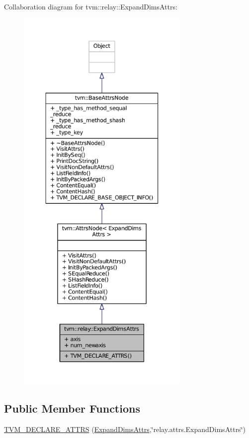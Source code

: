 Collaboration diagram for tvm\+:\+:relay\+:\+:Expand\+Dims\+Attrs\+:
\nopagebreak
\begin{figure}[H]
\begin{center}
\leavevmode
\includegraphics[height=550pt]{structtvm_1_1relay_1_1ExpandDimsAttrs__coll__graph}
\end{center}
\end{figure}
\subsection*{Public Member Functions}
\begin{DoxyCompactItemize}
\item 
\hyperlink{structtvm_1_1relay_1_1ExpandDimsAttrs_a81d264f861cabf1c5478e254b7f85f15}{T\+V\+M\+\_\+\+D\+E\+C\+L\+A\+R\+E\+\_\+\+A\+T\+T\+RS} (\hyperlink{structtvm_1_1relay_1_1ExpandDimsAttrs}{Expand\+Dims\+Attrs},\char`\"{}relay.\+attrs.\+Expand\+Dims\+Attrs\char`\"{})
\end{DoxyCompactItemize}
